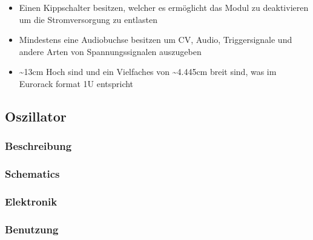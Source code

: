 \begin{itemize}
\item Einen Kippschalter besitzen, welcher es ermöglicht das Modul zu deaktivieren um die Stromversorgung zu entlasten
\item Mindestens eine Audiobuchse besitzen um CV, Audio, Triggersignale und andere Arten von Spannungssignalen auszugeben
\item \textasciitilde{}13cm Hoch sind und ein Vielfaches von \textasciitilde{}4.445cm breit sind, was im Eurorack format 1U entspricht
\end{itemize}

\subsection{Oszillator}
\label{sec:org61c967a}
\subsubsection{Beschreibung}
\label{sec:org790070d}
\subsubsection{Schematics}
\label{sec:org1a003ce}
\subsubsection{Elektronik}
\label{sec:org2c01623}
\subsubsection{Benutzung}
\label{sec:org81645dd}
